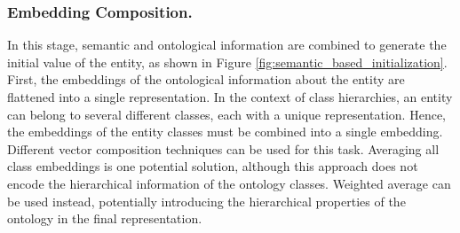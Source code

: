 \subsubsection{Embedding Composition.} \label{subsec:s4_embedding_compo}
In this stage, semantic and ontological information are combined to generate the initial value of the entity, as shown in Figure \ref{fig:semantic_based_initialization}. First, the embeddings of the ontological information about the entity are flattened into a single representation. In the context of class hierarchies, an entity can belong to several different classes, each with a unique representation. Hence, the embeddings of the entity classes must be combined into a single embedding. Different vector composition techniques can be used for this task. Averaging all class embeddings is one potential solution, although this approach does not encode the hierarchical information of the ontology classes. Weighted average can be used instead, potentially introducing the hierarchical properties of the ontology in the final representation.

